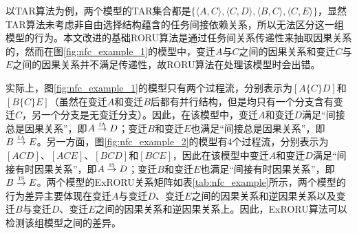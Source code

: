 以TAR算法为例，两个模型的TAR集合都是$\{\langle A,C\rangle,\langle C,D\rangle,\langle B,C\rangle,\langle C,E\rangle\}$，显然TAR算法未考虑非自由选择结构蕴含的任务间接依赖关系，所以无法区分这一组模型的行为。本文改进的基础RORU算法是通过任务间关系传递性来抽取因果关系的，然而在图\ref{fig:nfc_example_1}的模型中，变迁$A$与$C$之间的因果关系和变迁$C$与$E$之间的因果关系并不满足传递性，故RORU算法在处理该模型时会出错。

实际上，图\ref{fig:nfc_example_1}的模型只有两个过程流，分别表示为$[A\{C\}D]$和$[B\{C\}E]$（虽然在变迁$A$和变迁$B$后都有并行结构，但是均只有一个分支含有变迁$C$，另一个分支是无变迁分支）。因此，在该模型中，变迁$A$和变迁$D$满足“间接总是因果关系”，即$A\overset{\text{\tiny{IA}}}{\rightarrow}D$；变迁$B$和变迁$E$也满足“间接总是因果关系”，即$B\overset{\text{\tiny{IA}}}{\rightarrow}E$。另一方面，图\ref{fig:nfc_example_2}的模型有4个过程流，分别表示为$[ACD]$、$[ACE]$、$[BCD]$和$[BCE]$，因此在该模型中变迁$A$和变迁$D$满足“间接有时因果关系”，即$A\overset{\text{\tiny{IS}}}{\rightarrow}D$；变迁$B$和变迁$E$也满足“间接有时因果关系”，即$B\overset{\text{\tiny{IS}}}{\rightarrow}E$。两个模型的ExRORU关系矩阵如表\ref{tab:nfc_example}所示，两个模型的行为差异主要体现在变迁$A$与变迁$D$、变迁$E$之间的因果关系和逆因果关系以及变迁$B$与变迁$D$、变迁$E$之间的因果关系和逆因果关系上。因此，ExRORU算法可以检测该组模型之间的差异。

